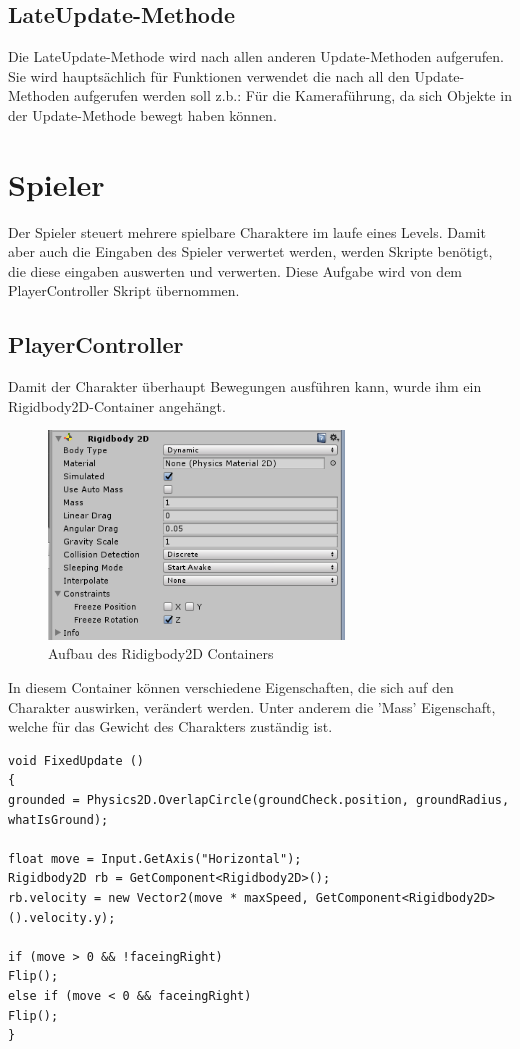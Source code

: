 \subsection{LateUpdate-Methode}
Die LateUpdate-Methode wird nach allen anderen Update-Methoden aufgerufen. Sie wird hauptsächlich für Funktionen verwendet die nach all den Update-Methoden aufgerufen werden soll z.b.: Für die Kameraführung, da sich Objekte in der Update-Methode bewegt haben können.
\section{Spieler}
Der Spieler steuert mehrere spielbare Charaktere im laufe  eines Levels. Damit aber auch die Eingaben des Spieler verwertet werden, werden Skripte benötigt, die diese eingaben auswerten und verwerten. Diese Aufgabe wird von dem PlayerController Skript übernommen. 
\subsection{PlayerController}
Damit der Charakter überhaupt Bewegungen ausführen kann, wurde ihm ein Rigidbody2D-Container angehängt.
\begin{figure}[htbp] 
	\centering
	\includegraphics[width=0.7\textwidth]{images/Ridigbody2D.png}
	\caption{Aufbau des Ridigbody2D Containers}
\end{figure}
In diesem Container können verschiedene Eigenschaften, die sich auf den Charakter auswirken, verändert werden. Unter anderem die 'Mass' Eigenschaft, welche für das Gewicht des Charakters zuständig ist.


\begin{lstlisting}[language={[Sharp]C}, caption=Player-Script]
void FixedUpdate ()
{
grounded = Physics2D.OverlapCircle(groundCheck.position, groundRadius, whatIsGround);

float move = Input.GetAxis("Horizontal");
Rigidbody2D rb = GetComponent<Rigidbody2D>();
rb.velocity = new Vector2(move * maxSpeed, GetComponent<Rigidbody2D>().velocity.y);

if (move > 0 && !faceingRight)
Flip();
else if (move < 0 && faceingRight)
Flip();
}
\end{lstlisting}

